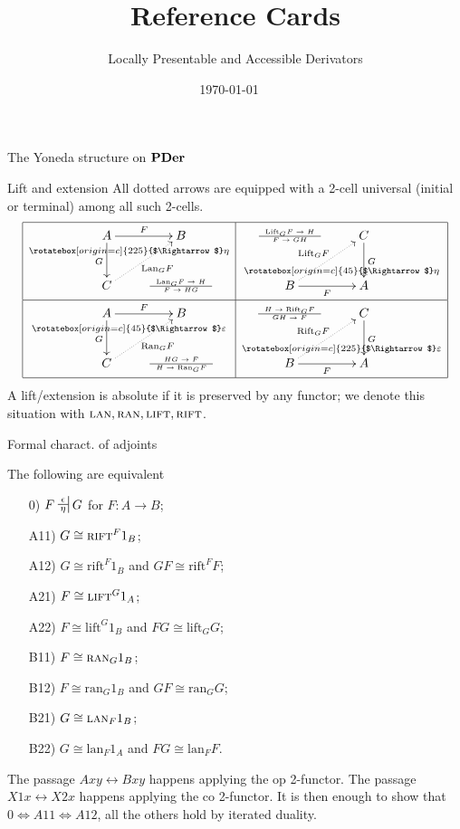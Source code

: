 \documentclass{beamer}
\title{Reference Cards}
\subtitle{Locally Presentable and Accessible Derivators}
\author{}
\date{\today$\quad$\currenttime}
\newcommand{\deduction}[4]{
	\begin{array}{c}
		#1 \to #2 \\ \hline
		#3 \to #4
	\end{array}
}
\newcommand{\Nearrow}{\rotatebox[origin=c]{45}{$\Rightarrow$}}
\newcommand{\Swarrow}{\rotatebox[origin=c]{225}{$\Rightarrow$}}
\newcommand{\adjunct}[2]{\nsststile{#2}{#1}}
\def\rift{\text{rift}}
\def\leeft{\text{lift}} %
\def\lan{\text{lan}}
\def\ran{\text{ran}}
\def\Rift{\text{Rift}}
\def\Lift{\text{Lift}}
\def\Ran{\text{Ran}}
\def\Lan{\text{Lan}}
\def\RIFT{\textsc{rift}}
\def\LIFT{\textsc{lift}}
\def\RAN{\textsc{ran}}
\def\LAN{\textsc{lan}}
\begin{document}
\begin{frame}
  \titlepage
\end{frame}
%
%
%
\begin{frame}
\huge
\centering
The Yoneda structure on $\bf PDer$
\end{frame}
%
%
%
%
%
\begin{frame}{Lift and extension}
All dotted arrows are equipped with a 2-cell universal (initial or terminal) among all such 2-cells.
    \[
\begin{array}{|c|c|}\hline
\xymatrix{A \ar@{}[dr]|(.3){\Swarrow\eta}\ar[d]_G \ar[r]^F& B \\ C \ar@{.>}[ur]_{\Lan_GF} & {\tiny \deduction{\Lan_GF}{H}{F}{HG}}} 
& 
\xymatrix{{\tiny \deduction{\Lift_GF}{H}{F}{GH}} & C\ar[d]^G \\ B\ar[r]_F \ar@{.>}[ur]^{\Lift_GF} & \ar@{}[ul]|(.3){\Nearrow\eta} A} \\ \hline
\xymatrix{A \ar@{}[dr]|(.3){\Nearrow\varepsilon}\ar[d]_G \ar[r]^F& B \\ C \ar@{.>}[ur]_{\Ran_GF} & {\tiny \deduction{HG}{F}{H}{\Ran_GF}}} 
& 
\xymatrix{{\tiny \deduction{H}{\Rift_GF}{GH}{F}} & C\ar[d]^G \\ B\ar[r]_F \ar@{.>}[ur]^{\Rift_GF} & \ar@{}[ul]|(.3){\Swarrow\varepsilon} A} \\ \hline
\end{array}
\]
A lift/extension is \alert{absolute} if it is preserved by any functor; we denote this situation with $\LAN,\RAN,\LIFT,\RIFT$.
\end{frame}
%
%
%
%
\begin{frame}{Formal charact. of adjoints}
\begin{center}
\begin{minipage}{.75\textwidth}
The following are equivalent
\begin{itemize}
    \item[0)] $F \adjunct{\epsilon}{\eta} G$ for $F : A \to B$;
\end{itemize}
\begin{itemize}
    \item[A11)] $G\cong \RIFT^F1_B$;
    \item[A12)] $G\cong \rift^F1_B$ and $GF\cong \rift^FF$;
    \item[A21)] $F\cong \LIFT^G1_A$;
    \item[A22)] $F\cong \leeft^G1_B$ and $FG\cong \leeft_GG$;
    \item[B11)] $F\cong \RAN_G1_B$;
    \item[B12)] $F\cong \ran_G1_B$ and $GF\cong \ran_GG$;
    \item[B21)] $G\cong \LAN_F1_B$;
    \item[B22)] $G\cong \lan_F 1_A$ and $FG\cong \lan_FF$.
\end{itemize}
\end{minipage}
\end{center}
The passage $Axy\leftrightarrow Bxy$ happens applying the op 2-functor. The passage $X1x\leftrightarrow X2x$ happens applying the co 2-functor. It is then enough to show that $0\iff A11\iff A12$, all the others hold by iterated duality.
\end{frame}
\end{document}
